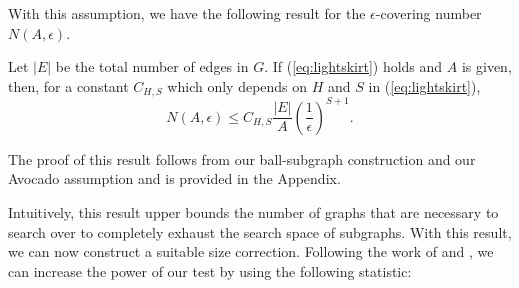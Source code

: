 With this assumption, we have the following result for the $\epsilon$-covering number $N(A,\epsilon)$.
\begin{lemma}
	\label{lm:entropy}
        Let $|E|$ be the total number of edges in $G$. If (\ref{eq:lightskirt}) holds and $A$ is given, 
        then, for a constant $C_{H,S}$ which only depends on $H$ and $S$ in (\ref{eq:lightskirt}),
	{\begin{equation}
	    \label{eq:entropy}
	    N(A,\epsilon)\le C_{H,S}\frac{|E|}{ A}\left(\frac{1}{ \epsilon}\right)^{S+1}.
	\end{equation}}
\end{lemma}
The proof of this result follows from our ball-subgraph construction and our Avocado assumption and is provided in the Appendix.

Intuitively, this result upper bounds the number of graphs that are necessary to search over to completely exhaust the search space of subgraphs. With this result, we can now construct a suitable size correction. 
Following the work of \cite{walther2010optimal} and \cite{wang2016structured}, we can increase the power of our test by using the following statistic:
